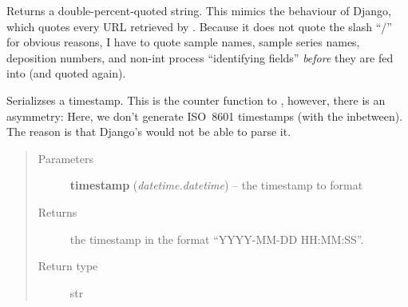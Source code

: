\documentclass[a4paper,11pt,english]{sphinxmanual}
\begin{document}

\begin{fulllineitems}
\label{programming/remote_client:jb_remote.common.double_urlquote}
Returns a double-percent-quoted string.  This mimics the behaviour of
Django, which quotes every URL retrieved by
.  Because it does not quote the slash
“/” for obvious reasons, I have to quote sample names, sample series names,
deposition numbers, and non-int process “identifying fields” \emph{before} they
are fed into  (and quoted again).

\end{fulllineitems}


\begin{fulllineitems}
\label{programming/remote_client:jb_remote.common.format_timestamp}
Serializses a timestamp.  This is the counter function to {\hyperref[programming/remote_client:jb_remote.common.parse_timestamp]{}},
however, there is an asymmetry: Here, we don't generate ISO 8601 timestamps
(with the  inbetween).  The reason is that Django's 
would not be able to parse it.
\begin{quote}\begin{description}
\item[{Parameters}] \leavevmode
\textbf{timestamp} (\emph{datetime.datetime}) -- the timestamp to format

\item[{Returns}] \leavevmode
the timestamp in the format “YYYY-MM-DD HH:MM:SS”.

\item[{Return type}] \leavevmode
str

\end{description}\end{quote}

\end{fulllineitems}

\end{document}
